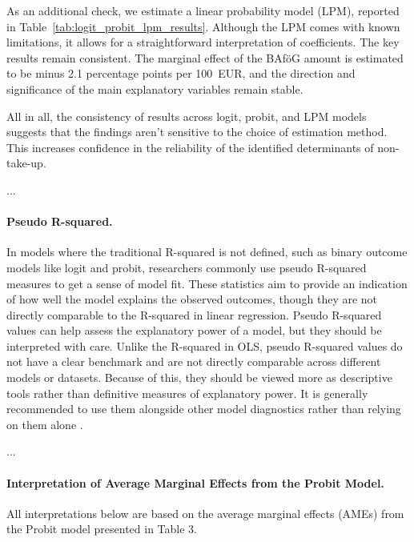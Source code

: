 As an additional check, we estimate a linear probability model (LPM), reported in Table~\ref{tab:logit_probit_lpm_results}. 
Although the LPM comes with known limitations, it allows for a straightforward interpretation of coefficients. 
The key results remain consistent. The marginal effect of the BAföG amount is estimated to be minus 2.1 percentage points per 100~EUR, and the direction and significance of the main explanatory variables remain stable.

All in all, the consistency of results across logit, probit, and LPM models suggests that the findings aren't sensitive to the choice of estimation method. This increases confidence in the reliability of the identified determinants of non-take-up.

...

\paragraph{Pseudo R-squared.} In models where the traditional R-squared is not defined, such as binary outcome models like logit and probit, researchers commonly use pseudo R-squared measures to get a sense of model fit. These statistics aim to provide an indication of how well the model explains the observed outcomes, though they are not directly comparable to the R-squared in linear regression. Pseudo R-squared values can help assess the explanatory power of a model, but they should be interpreted with care. Unlike the R-squared in OLS, pseudo R-squared values do not have a clear benchmark and are not directly comparable across different models or datasets. Because of this, they should be viewed more as descriptive tools rather than definitive measures of explanatory power. It is generally recommended to use them alongside other model diagnostics rather than relying on them alone \citep{ozili_acceptable_2023}.






...

\paragraph{Interpretation of Average Marginal Effects from the Probit Model.} All interpretations below are based on the average marginal effects (AMEs) from the Probit model presented in Table 3.

